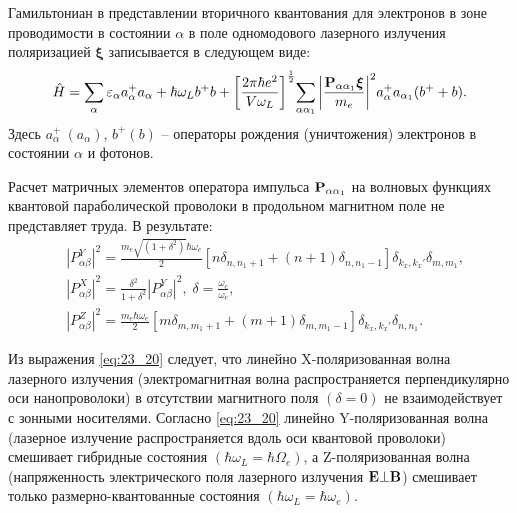 Гамильтониан в представлении вторичного квантования для электронов в зоне проводимости в состоянии $\alpha $ в поле одномодового лазерного излучения поляризацией ${\mathbf \xi }$ записывается в следующем виде:
\begin{equation} \label{eq:23_10} 
\hat{H}=\sum_{\alpha } {\varepsilon_{\alpha } a^+_{\alpha } a_{\alpha }} + \hbar \omega_L b^+ b + {\left[\frac{2\pi \hbar e^2} {V \omega_L} \right]}^{\frac{1}{2}} {\sum_{\alpha \alpha_1}{\left|\frac{\boldsymbol{\mathbf{P}}_{\alpha \alpha_1} \boldsymbol{\mathbf{\xi}}}{m_e}\right|}}^2 a^+_{\alpha } a_{\alpha_1} (b^+ + b).
\end{equation}
Здесь $a^+_{\alpha }\ (a_{\alpha })$, $b^+ (b)$ -- операторы рождения (уничтожения) электронов в состоянии $\alpha $ и фотонов.

Расчет матричных элементов оператора импульса $\boldsymbol{\mathbf{P}}_{\alpha\alpha_1}$ на волновых функциях квантовой параболической проволоки в продольном магнитном поле \cite{Hashimzade2005} не представляет труда. В результате:
\begin{equation} \label{eq:23_20}
\begin{aligned}
&\left| P^Y_{\alpha \beta }\right|^2=
\frac{m_e \sqrt{\left({1+\delta }^2\right)} \hbar\omega_e}{2} \left[  n \delta_{n,n_1+1} + (n+1) \delta_{n,n_1-1} \right]\delta_{k_x,k_x'}\delta_{m,m_1} , \\
&{\left| P^X_{\alpha \beta }\right|}^2=\frac{\delta^2}{{1+\delta^2 }}{\left|P^Y_{\alpha \beta }\right|}^2, \;
\delta =\frac{\omega_c}{\omega_e},\\
&{\left| P^Z_{\alpha \beta }\right|}^2=\frac{m_e \hbar\omega_e}{2} \left[ m \delta_{m,m_1+1} + (m+1){\delta }_{m,m_1-1} \right]  \delta_{k_x,k_x'} \delta_{n,n_1}.
\end{aligned}
\end{equation}

Из выражения \eqref{eq:23_20} следует, что линейно X-поляризованная волна лазерного излучения (электромагнитная волна распространяется перпендикулярно оси нанопроволоки) в отсутствии магнитного поля $(\delta =0)$ не взаимодействует с зонными носителями. Согласно \eqref{eq:23_20} линейно Y-поляризованная волна (лазерное излучение распространяется вдоль оси квантовой проволоки) смешивает гибридные состояния $\left( \hbar\omega_L = \hbar\Omega_e \right) $, а Z-поляризованная волна (напряженность электрического поля лазерного излучения $\boldsymbol{\mathbf{E}}\bot \boldsymbol{\mathbf{B}}$) смешивает только размерно-квантованные состояния $ \left( \hbar\omega_L = \hbar\omega_e \right) $.

